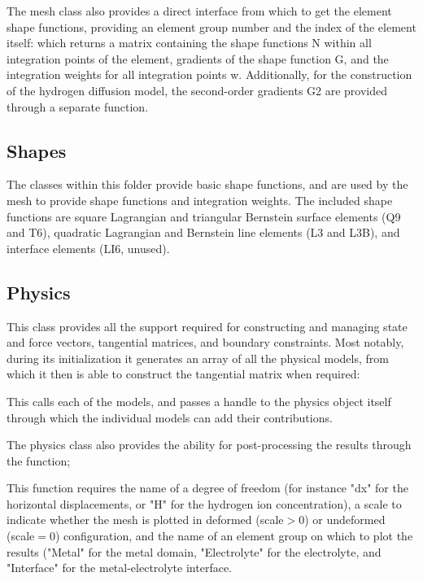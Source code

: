 \documentclass[3p]{elsarticle} %
\begin{document}
The mesh class also provides a direct interface from which to get the element shape functions, providing an element group number and the index of the element itself:
%
which returns a matrix containing the shape functions N within all integration points of the element, gradients of the shape function G, and the integration weights for all integration points w. Additionally, for the construction of the hydrogen diffusion model, the second-order gradients G2 are provided through a separate function.

\subsection{Shapes}
The classes within this folder provide basic shape functions, and are used by the mesh to provide shape functions and integration weights. The included shape functions are square Lagrangian and triangular Bernstein surface elements (Q9 and T6), quadratic Lagrangian and Bernstein line elements (L3 and L3B), and interface elements (LI6, unused).

\subsection{Physics}
This class provides all the support required for constructing and managing state and force vectors, tangential matrices, and boundary constraints. Most notably, during its initialization it generates an array of all the physical models, from which it then is able to construct the tangential matrix when required:

This calls each of the models, and passes a handle to the physics object itself through which the individual models can add their contributions. 

The physics class also provides the ability for post-processing the results through the function;

This function requires the name of a degree of freedom (for instance "dx" for the horizontal displacements, or "H" for the hydrogen ion concentration), a scale to indicate whether the mesh is plotted in deformed (scale$>$0) or undeformed (scale$=$0) configuration, and the name of an element group on which to plot the results ("Metal" for the metal domain, "Electrolyte" for the electrolyte, and "Interface" for the metal-electrolyte interface.
\end{document}
